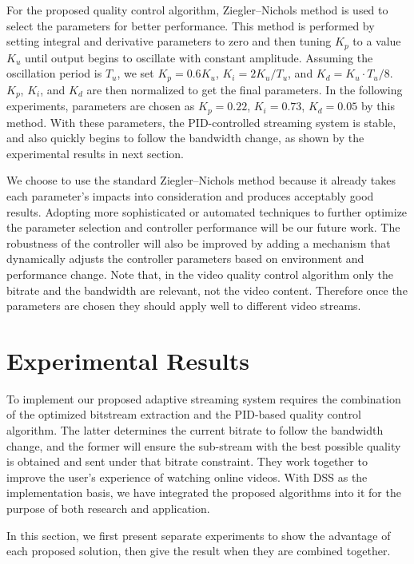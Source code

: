 \documentclass[journal]{IEEEtran}
\begin{document}
For the proposed quality control algorithm, Ziegler--Nichols method \cite{Ziegler42} is used to select the parameters for better performance. This method is performed by setting integral and derivative parameters to zero and then tuning $K_p$ to a value $K_u$ until output begins to oscillate with constant amplitude. Assuming the oscillation period is $T_u$, we set $K_p = 0.6K_u$, $K_i = 2K_u/T_u$, and $K_d = K_u \cdot T_u/8$. $K_p$, $K_i$, and $K_d$ are then normalized to get the final parameters. In the following experiments, parameters are chosen as $K_p = 0.22$, $K_i = 0.73$, $K_d = 0.05$ by this method. With these parameters, the PID-controlled streaming system is stable, and also quickly begins to follow the bandwidth change, as shown by the experimental results in next section.

We choose to use the standard Ziegler--Nichols method because it already takes each parameter's impacts into consideration and produces acceptably good results. Adopting more sophisticated or automated techniques to further optimize the parameter selection and controller performance will be our future work. The robustness of the controller will also be improved by adding a mechanism that dynamically adjusts the controller parameters based on environment and performance change. Note that, in the video quality control algorithm only the bitrate and the bandwidth are relevant, not the video content. Therefore once the parameters are chosen they should apply well to different video streams.


\section{Experimental Results}
\label{sec:experiment}

To implement our proposed adaptive streaming system requires the combination of the optimized bitstream extraction and the PID-based quality control algorithm. The latter determines the current bitrate to follow the bandwidth change, and the former will ensure the sub-stream with the best possible quality is obtained and sent under that bitrate constraint. They work together to improve the user's experience of watching online videos. With DSS as the implementation basis, we have integrated the proposed algorithms into it for the purpose of both research and application.

In this section, we first present separate experiments to show the advantage of each proposed solution, then give the result when they are combined together.
\end{document}
